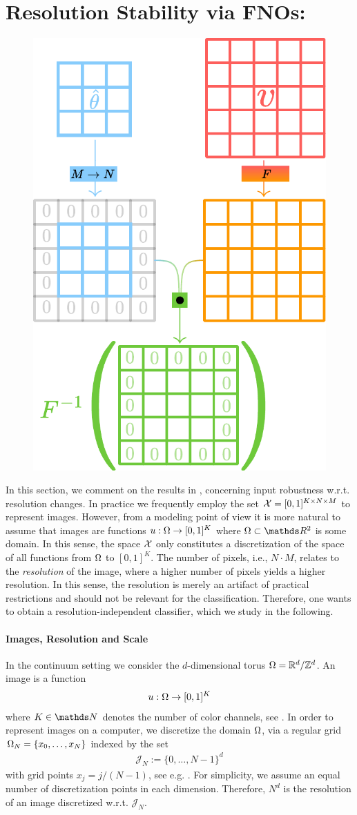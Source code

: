 \section{Resolution Stability via FNOs: \cite{kabri2023resolution}}\label{sec:FNO}
%
\setlength\intextsep{0pt}
\begin{figure}
\centering
\includegraphics[width=.4\textwidth]{atelier/FNO/trigo.pdf}
\end{figure}
%
In this section, we comment on the results in \cite{kabri2023resolution}, concerning input robustness w.r.t. resolution changes. In practice we frequently employ the set $\mathcal{X}=[0,1]^{K\times N\times M}$ to represent images. However, from a modeling point of view it is more natural to assume that images are functions $u:\Omega\to[0,1]^K$ where $\domain\subset\R^2$ is some domain. In this sense, the space $\mathcal{X}$ only constitutes a discretization of the space of all functions from $\Omega$ to $[0,1]^K$. The number of pixels, i.e., $N\cdot M$, relates to the \emph{resolution} of the image, where a higher number of pixels yields a higher resolution. In this sense, the resolution is merely an artifact of practical restrictions and should not be relevant for the classification. Therefore, one wants to obtain a resolution-independent classifier, which we study in the following.
%
\paragraph{Images, Resolution and Scale}
%
%
In the continuum setting we consider the $d$-dimensional torus $\Omega = \mathbb{R}^d / \mathbb{Z}^d$. An image is a function 
%
\begin{align*}
u:\Omega\to[0,1]^K
\end{align*}
%
where $K\in\N$ denotes the number of color channels, see \cite{gonzales1987digital}. In order to represent images on a computer, we discretize the domain $\Omega$, via a regular grid $\Omega_N = \{x_0,\ldots,x_N\}$ indexed by the set
%
\begin{align*}
\mathcal{J}_N := \{0,\ldots, N-1\}^d
\end{align*}
%
with grid points $x_j = j/(N-1)$, see e.g. \cite{kabri2022FNO, kovachki2021universal}. For simplicity, we assume an equal number of discretization points in each dimension. Therefore, $N^d$ is the resolution of an image discretized w.r.t. $\mathcal{J}_N$. 

